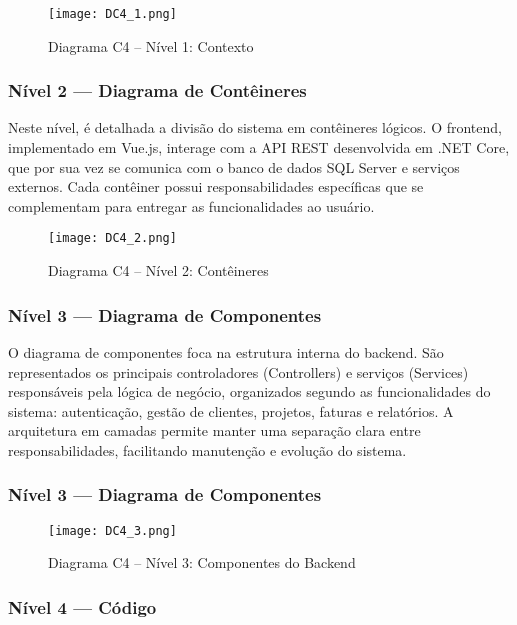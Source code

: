 \documentclass[a4paper,12pt]{article}
\begin{document}
\begin{figure}[H]
  \centering
  \texttt{[image: DC4\_1.png]}
  \caption{Diagrama C4 – Nível 1: Contexto}
  \label{fig:c4-contexto}
\end{figure}

\subsubsection*{Nível 2 — Diagrama de Contêineres}

Neste nível, é detalhada a divisão do sistema em contêineres lógicos. O frontend, implementado em Vue.js, interage com a API REST desenvolvida em .NET Core, que por sua vez se comunica com o banco de dados SQL Server e serviços externos. Cada contêiner possui responsabilidades específicas que se complementam para entregar as funcionalidades ao usuário.

\begin{figure}[H]
  \centering
  \texttt{[image: DC4\_2.png]}
  \caption{Diagrama C4 – Nível 2: Contêineres}
  \label{fig:c4-container}
\end{figure}

\subsubsection*{Nível 3 — Diagrama de Componentes}

O diagrama de componentes foca na estrutura interna do backend. São representados os principais controladores (Controllers) e serviços (Services) responsáveis pela lógica de negócio, organizados segundo as funcionalidades do sistema: autenticação, gestão de clientes, projetos, faturas e relatórios. A arquitetura em camadas permite manter uma separação clara entre responsabilidades, facilitando manutenção e evolução do sistema.

\afterpage{\clearpage}
\begin{landscape}
\subsubsection*{Nível 3 — Diagrama de Componentes}
\begin{figure}[H]
  \centering
  \texttt{[image: DC4\_3.png]}
  \caption{Diagrama C4 – Nível 3: Componentes do Backend}
  \label{fig:c4-componentes}
\end{figure}
\end{landscape}

\subsubsection*{Nível 4 — Código}
\end{document}
